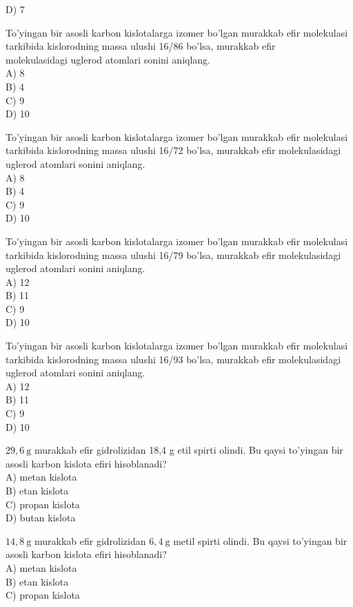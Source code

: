 D) 7
  \item To'yingan bir asosli karbon kislotalarga izomer bo'lgan murakkab efir molekulasi tarkibida kislorodning massa ulushi 16/86 bo'lsa, murakkab efir\\
molekulasidagi uglerod atomlari sonini aniqlang.\\
A) 8\\
B) 4\\
C) 9\\
D) 10
  \item To'yingan bir asosli karbon kislotalarga izomer bo'lgan murakkab efir molekulasi tarkibida kislorodning massa ulushi 16/72 bo'lsa, murakkab efir molekulasidagi uglerod atomlari sonini aniqlang.\\
A) 8\\
B) 4\\
C) 9\\
D) 10
  \item To'yingan bir asosli karbon kislotalarga izomer bo'lgan murakkab efir molekulasi tarkibida kislorodning massa ulushi 16/79 bo'lsa, murakkab efir molekulasidagi uglerod atomlari sonini aniqlang.\\
A) 12\\
B) 11\\
C) 9\\
D) 10
  \item To'yingan bir asosli karbon kislotalarga izomer bo'lgan murakkab efir molekulasi tarkibida kislorodning massa ulushi 16/93 bo'lsa, murakkab efir molekulasidagi uglerod atomlari sonini aniqlang.\\
A) 12\\
B) 11\\
C) 9\\
D) 10
  \item $29,6 \mathrm{~g}$ murakkab efir gidrolizidan 18,4 g etil spirti olindi. Bu qaysi to'yingan bir asosli karbon kislota efiri hisoblanadi?\\
A) metan kislota\\
B) etan kislota\\
C) propan kislota\\
D) butan kislota
  \item $14,8 \mathrm{~g}$ murakkab efir gidrolizidan $6,4 \mathrm{~g}$ metil spirti olindi. Bu qaysi to'yingan bir asosli karbon kislota efiri hisoblanadi?\\
A) metan kislota\\
B) etan kislota\\
C) propan kislota\\
